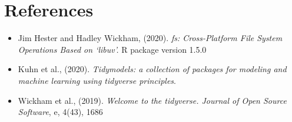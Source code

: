 \documentclass[
]{article}
\begin{document}
\hypertarget{sec:Ref}{%
\section{References}\label{sec:Ref}}

\begin{itemize}
\item
  Jim Hester and Hadley Wickham, (2020). \emph{fs: Cross-Platform File
  System Operations Based on `libuv'.} R package version 1.5.0
\item
  Kuhn et al., (2020). \emph{Tidymodels: a collection of packages for
  modeling and machine learning using tidyverse principles}.
\item
  Wickham et al., (2019). \emph{Welcome to the tidyverse. Journal of
  Open Source Software}, e, 4(43), 1686
\end{itemize}
\end{document}
